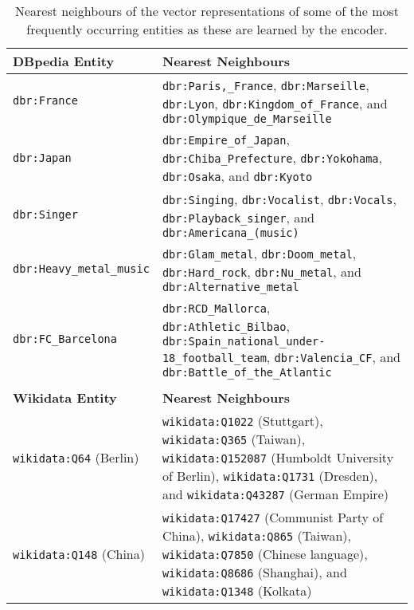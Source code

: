 \documentclass[preprint,5p]{elsarticle}
\begin{document}
\begin{table*}[h!]
  \caption{Nearest neighbours of the vector representations of some of the most frequently occurring entities as these are learned by the encoder.}
  \begin{center}
    \scriptsize
    \setlength{\extrarowheight}{1.5pt}
    \begin{tabular}{|L{2.7cm}|L{11.5cm}|}\hline

      {\textbf{DBpedia Entity}} & \textbf{Nearest Neighbours} \\ \hline
      {\texttt{dbr:France}} & \texttt{dbr:Paris,\_France}, \texttt{dbr:Marseille}, \texttt{dbr:Lyon}, \texttt{dbr:Kingdom\_of\_France}, and \texttt{dbr:Olympique\_de\_Marseille} \\ \hline
      {\texttt{dbr:Japan}} & \texttt{dbr:Empire\_of\_Japan}, \texttt{dbr:Chiba\_Prefecture}, \texttt{dbr:Yokohama}, \texttt{dbr:Osaka}, and \texttt{dbr:Kyoto} \\ \hline
      {\texttt{dbr:Singer}} & \texttt{dbr:Singing}, \texttt{dbr:Vocalist}, \texttt{dbr:Vocals}, \texttt{dbr:Playback\_singer}, and \texttt{dbr:Americana\_(music)} \\ \hline
      {\texttt{dbr:Heavy\_metal\_music}} & \texttt{dbr:Glam\_metal}, \texttt{dbr:Doom\_metal}, \texttt{dbr:Hard\_rock}, \texttt{dbr:Nu\_metal}, and \texttt{dbr:Alternative\_metal} \\ \hline
      {\texttt{dbr:FC\_Barcelona}} & \texttt{dbr:RCD\_Mallorca}, \texttt{dbr:Athletic\_Bilbao}, \texttt{dbr:Spain\_national\_under-18\_football\_team}, \texttt{dbr:Valencia\_CF}, and \texttt{dbr:Battle\_of\_the\_Atlantic} \\ \hline
       \\ \hline
      
      {\textbf{Wikidata Entity}} & \textbf{Nearest Neighbours} \\ \hline
      {\texttt{wikidata:Q64}} (Berlin) & \texttt{wikidata:Q1022} (Stuttgart), \texttt{wikidata:Q365} (Taiwan), \texttt{wikidata:Q152087} (Humboldt University of Berlin), \texttt{wikidata:Q1731} (Dresden), and \texttt{wikidata:Q43287} (German Empire) \\ \hline


      {\texttt{wikidata:Q148}} (China) & \texttt{wikidata:Q17427} (Communist Party of China), \texttt{wikidata:Q865} (Taiwan), \texttt{wikidata:Q7850} (Chinese language), \texttt{wikidata:Q8686} (Shanghai), and \texttt{wikidata:Q1348} (Kolkata) \\ \hline


\end{tabular}
\end{center}
\end{table*}
\end{document}
